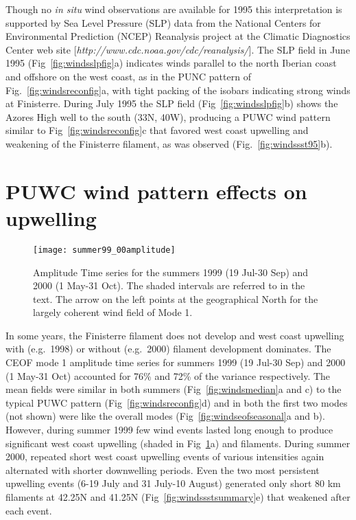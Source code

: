 Though no \emph{in situ} wind observations are available for 1995
this interpretation is supported by Sea Level Pressure (SLP) data
from the National Centers for Environmental Prediction (NCEP)
Reanalysis project at the Climatic Diagnostics Center web site
[{\it http://www.cdc.noaa.gov/cdc/reanalysis/}].  The SLP field in
June 1995 (Fig~\ref{fig:windsslpfig}a)  indicates winds parallel
to the north Iberian coast and offshore on the west coast, as in
the PUNC pattern of Fig.~\ref{fig:windsreconfig}a, with tight
packing of the isobars indicating strong winds at Finisterre.
During July 1995 the SLP field (Fig~\ref{fig:windsslpfig}b) shows
the Azores High well to the south (33\deg N, 40\deg W), producing
a PUWC wind pattern similar to Fig~\ref{fig:windsreconfig}c that
favored west coast upwelling and weakening of the Finisterre
filament, as was observed (Fig.~\ref{fig:windssst95}b).

\section{PUWC wind pattern effects on upwelling}
\label{nofinisterre}
\begin{figure}
\centering
\texttt{[image: summer99\_00amplitude]}
\caption{Amplitude Time series for the summers 1999 (19 Jul-30
Sep) and 2000 (1 May-31 Oct). The shaded intervals are referred to
in the text. The arrow on the left points at the geographical
North for the largely coherent wind field of Mode 1.}
\label{fig:windsamp9900}
\end{figure}

In some years, the Finisterre filament does not develop and west
coast upwelling with (e.g.~1998) or without (e.g.~2000) filament
development dominates. The CEOF mode 1 amplitude time series for
summers 1999 (19 Jul-30 Sep) and 2000 (1 May-31 Oct) accounted for
76\% and 72\% of the variance respectively. The mean fields were
similar in both summers (Fig~\ref{fig:windsmedian}a and c) to the
typical PUWC pattern (Fig~\ref{fig:windsreconfig}d) and in both
the first two modes (not shown) were like the overall modes
(Fig~\ref{fig:windseofseasonal}a and b). However, during summer
1999 few wind events lasted long enough to produce significant
west coast upwelling (shaded in Fig~\ref{fig:windsamp9900}a) and
filaments. During summer 2000, repeated short west coast upwelling
events of various intensities again alternated with shorter
downwelling periods. Even the two most persistent upwelling events
(6-19 July and 31 July-10 August) generated only short 80 km
filaments at 42.25\deg N and 41.25\deg N
(Fig~\ref{fig:windssstsummary}e) that weakened after each event.

